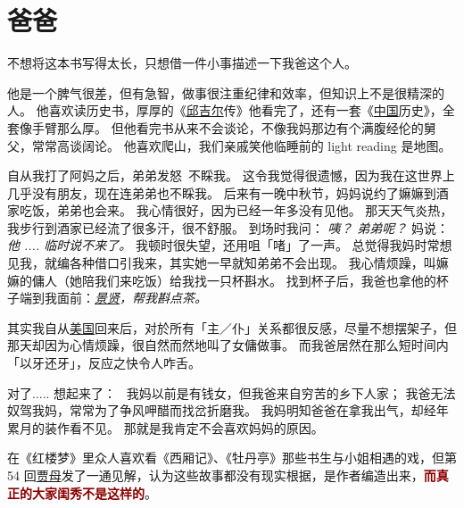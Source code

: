 \documentclass[12pt]{report}
\newcommand{\speechCn}[1]{\textrm{\textit{\textcolor{Speech}{#1}}}}
\renewcommand{\em}[1]{\textbf{\textcolor{DarkRed}{#1}}}
\begin{document}

\chapter{爸爸}

不想将这本书写得太长，只想借一件小事描述一下我爸这个人。

他是一个脾气很差，但有急智，做事很注重纪律和效率，但知识上不是很精深的人。  他喜欢读历史书，厚厚的《\uline{邱吉尔}传》他看完了，还有一套《\uline{中国}历史》，全套像手臂那么厚。  但他看完书从来不会谈论，不像我妈那边有个满腹经伦的舅父，常常高谈阔论。 他喜欢爬山，我们亲戚笑他临睡前的 light reading 是地图。

自从我打了阿妈之后，弟弟发怒~不睬我。 这令我觉得很遗憾，因为我在这世界上几乎没有朋友，现在连弟弟也不睬我。 后来有一晚中秋节，妈妈说约了嫲嫲到酒家吃饭，弟弟也会来。  我心情很好，因为已经一年多没有见他。  那天天气炎热，我步行到酒家已经流了很多汗，很不舒服。 到场时我问： \speechCn{咦？ 弟弟呢？}  妈说： \speechCn{他 .... 临时说不来了。}  我顿时很失望，还用咀「啫」了一声。  总觉得我妈时常想见我，就编各种借口引我来，其实她一早就知弟弟不会出现。 我心情烦躁，叫嫲嫲的傭人（她陪我们来吃饭）给我找一只杯斟水。 找到杯子后，我爸也拿他的杯子端到我面前：\speechCn{\uline{景贤}，帮我斟点茶。}

其实我自从\uline{美国}回来后，对於所有「主／仆」关系都很反感，尽量不想摆架子，但那天却因为心情烦躁，很自然而然地叫了女傭做事。  而我爸居然在那么短时间内「以牙还牙」，反应之快令人咋舌。

对了..... 想起来了：~ 我妈以前是有钱女，但我爸来自穷苦的乡下人家； 我爸无法奴驾我妈，常常为了争风呷醋而找岔折磨我。  我妈明知爸爸在拿我出气，却经年累月的装作看不见。  那就是我肯定不会喜欢妈妈的原因。

在《红楼梦》里众人喜欢看《西厢记》、《牡丹亭》那些书生与小姐相遇的戏，但第 54 回\uline{贾母}发了一通见解，认为这些故事都没有现实根据，是作者编造出来，\em{而真正的大家闺秀不是这样的}。
\end{document}
